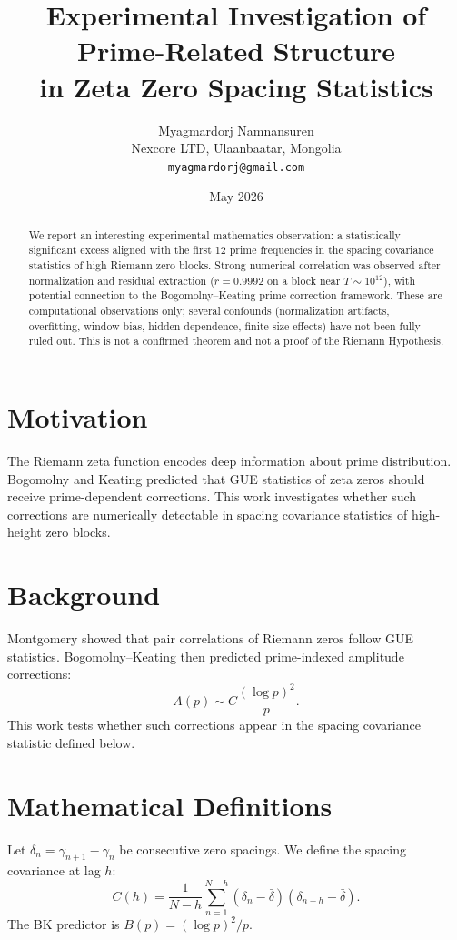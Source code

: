 \documentclass[11pt]{article}
\title{Experimental Investigation of Prime-Related Structure\\
in Zeta Zero Spacing Statistics}
\author{Myagmardorj Namnansuren\\
\small Nexcore LTD, Ulaanbaatar, Mongolia\\
\small \texttt{myagmardorj@gmail.com}}
\date{May 2026}
\begin{document}
\maketitle

\begin{abstract}
We report an interesting experimental mathematics observation:
a statistically significant excess aligned with the first 12
prime frequencies in the spacing covariance statistics of high
Riemann zero blocks. Strong numerical correlation was observed
after normalization and residual extraction
($r = 0.9992$ on a block near $T \sim 10^{12}$),
with potential connection to the Bogomolny--Keating
prime correction framework. These are computational observations
only; several confounds (normalization artifacts, overfitting,
window bias, hidden dependence, finite-size effects) have not
been fully ruled out. This is not a confirmed theorem and
not a proof of the Riemann Hypothesis.
\end{abstract}

\section{Motivation}

The Riemann zeta function encodes deep information about
prime distribution. Bogomolny and Keating \cite{bk1996}
predicted that GUE statistics of zeta zeros should receive
prime-dependent corrections. This work investigates whether
such corrections are numerically detectable in spacing
covariance statistics of high-height zero blocks.

\section{Background}

Montgomery \cite{montgomery1973} showed that pair correlations
of Riemann zeros follow GUE statistics. Bogomolny--Keating
\cite{bk1996} then predicted prime-indexed amplitude corrections:
\[
A(p) \sim C \frac{(\log p)^2}{p}.
\]
This work tests whether such corrections appear in the
spacing covariance statistic defined below.

\section{Mathematical Definitions}

Let $\delta_n = \gamma_{n+1} - \gamma_n$ be consecutive
zero spacings. We define the spacing covariance at lag $h$:
\[
C(h) = \frac{1}{N-h} \sum_{n=1}^{N-h}
(\delta_n - \bar\delta)(\delta_{n+h} - \bar\delta).
\]
The BK predictor is $B(p) = (\log p)^2/p$.
\end{document}

